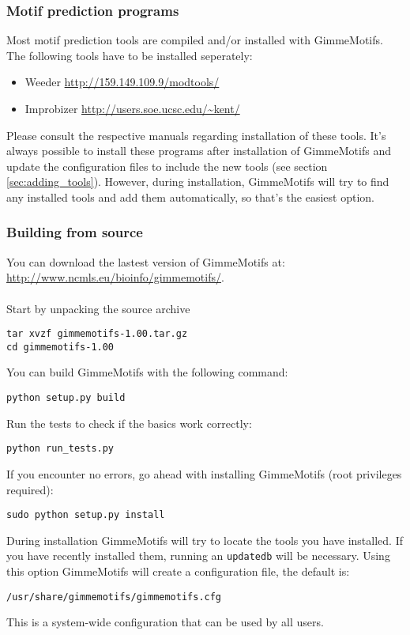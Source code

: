 \documentclass[11pt]{article}
\begin{document}
\subsubsection{Motif prediction programs}
Most motif prediction tools are compiled and/or installed with GimmeMotifs. The following tools have to be installed seperately: 
\begin{itemize}
\item Weeder \cite{pavesi_weeder_2004} \url{http://159.149.109.9/modtools/}
\item Improbizer \cite{ao_environmentally_2004} \url{http://users.soe.ucsc.edu/~kent/}
\end{itemize}
Please consult the respective manuals regarding installation of these tools. It's always possible to install these programs after installation of GimmeMotifs and update the configuration files to include the new tools (see section \ref{sec:adding_tools}). However, during installation, GimmeMotifs will try to find any installed tools and add them automatically, so that's the easiest option.

\subsubsection{Building from source}
You can download the lastest version of GimmeMotifs at:\\
\url{http://www.ncmls.eu/bioinfo/gimmemotifs/}. \\
\\
Start by unpacking the source archive
\begin{verbatim}
tar xvzf gimmemotifs-1.00.tar.gz
cd gimmemotifs-1.00
\end{verbatim}
You can build GimmeMotifs with the following command:
\begin{verbatim}
python setup.py build
\end{verbatim}
Run the tests to check if the basics work correctly:
\begin{verbatim}
python run_tests.py
\end{verbatim}
If you encounter no errors, go ahead with installing GimmeMotifs (root privileges required):
\begin{verbatim}
sudo python setup.py install
\end{verbatim}
During installation GimmeMotifs will try to locate the tools you have installed. If you have recently installed them, running an \texttt{updatedb} will be necessary. Using this option GimmeMotifs will create a configuration file, the default is:
\begin{verbatim}
/usr/share/gimmemotifs/gimmemotifs.cfg
\end{verbatim}
This is a system-wide configuration that can be used by all users.
\end{document}
